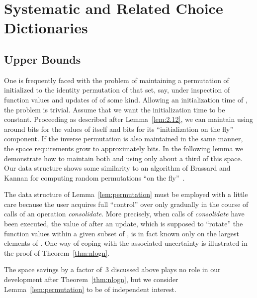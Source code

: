 \documentclass[envcountsame,envcountsect,undated,nolinenumbers]{lnthi}
\def\Tvn#1{\hbox{\textit{#1\/}}}
\begin{document}
\section{Systematic and Related Choice Dictionaries}
\label{sec:systematic}

\subsection{Upper Bounds}

One is frequently faced with the problem of
maintaining a permutation  of 
initialized to the identity permutation of that
set, say, under inspection of function values
and updates of  of some kind.
Allowing an initialization time of ,
the problem is trivial.
Assume that we want the initialization time to be constant.
Proceeding as described after Lemma~\ref{lem:2.12},
we can maintain  using around  bits
for the values of  itself and  bits 
for its ``initialization on the fly'' component.
If the inverse permutation  is also
maintained in the same manner, the space
requirements grow to approximately
 bits.
In the following lemma we demonstrate how to maintain
both  and  using only about
a third of this space.
Our data structure shows some
similarity to an algorithm of Brassard and Kannan
for computing random permutations
``on the fly''~\cite{BraK88}.

The data structure of
Lemma~\ref{lem:permutation}
must be employed with a little care because the
user acquires full ``control'' over  only
gradually in the course of
 calls of an operation \Tvn{consolidate}.
More precisely, when  calls of \Tvn{consolidate}
have been executed, the value of  after
an update, which is supposed to ``rotate'' 
the function values within a
given subset of ,
is in fact known only on the  largest elements
of .
One way of coping with the associated uncertainty
is illustrated in the
proof of Theorem~\ref{thm:nlogn}.

The space savings by a factor of~3 discussed
above plays no role in our development after
Theorem~\ref{thm:nlogn}, but we consider
Lemma~\ref{lem:permutation} to be
of independent interest.
\end{document}
